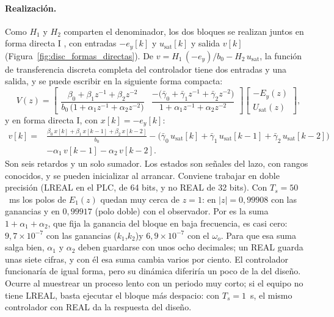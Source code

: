 \paragraph{Realización.} Como $H_1$ y $H_2$ comparten el denominador, los dos
bloques se realizan juntos en forma directa I \cite{chen1993analog}, con
entradas $-e_y[k]$ y $u_{\mathrm{sat}}[k]$ y salida $v[k]$
(Figura~\ref{fig:disc_formas_directas}). De
$v = H_1\,(-e_y)/b_0 - H_2\,u_{\mathrm{sat}}$, la función de transferencia
discreta completa del controlador tiene dos entradas y una salida, y se puede escribir en la
siguiente forma compacta:
\begin{equation}
V(z) =
\begin{bmatrix}
\dfrac{\beta_0 + \beta_1 z^{-1} + \beta_2 z^{-2}}{b_0\,\bigl(1 + \alpha_1 z^{-1} + \alpha_2 z^{-2}\bigr)}
&
\dfrac{-\bigl(\bar{\gamma}_0 + \bar{\gamma}_1 z^{-1} + \bar{\gamma}_2 z^{-2}\bigr)}{1 + \alpha_1 z^{-1} + \alpha_2 z^{-2}}
\end{bmatrix}
\begin{bmatrix} -E_y(z) \\[4pt] U_{\mathrm{sat}}(z) \end{bmatrix},
\label{eq:disc_gpi_miso}
\end{equation}
y en forma directa I, con $x[k] = -e_y[k]$:
\begin{equation}
\begin{aligned}
v[k] = {} & \frac{\beta_0\,x[k] + \beta_1\,x[k-1] + \beta_2\,x[k-2]}{b_0}
- \bigl(\bar{\gamma}_0\,u_{\mathrm{sat}}[k] + \bar{\gamma}_1\,u_{\mathrm{sat}}[k-1] + \bar{\gamma}_2\,u_{\mathrm{sat}}[k-2]\bigr) \\
& - \alpha_1\,v[k-1] - \alpha_2\,v[k-2] .
\end{aligned}
\label{eq:disc_gpi_fd1}
\end{equation}
Son seis retardos y un solo sumador. Los estados son señales del lazo, con
rangos conocidos, y se pueden inicializar al arrancar. Conviene trabajar en doble precisión (LREAL en el PLC, de 64 bits, y no REAL de 32 bits).
Con $T_s = 50$~ms los polos de $E_1(z)$ quedan muy cerca de $z = 1$: en $|z| = 0{,}99908$ con
las ganancias y en $0{,}99917$ (polo doble) con el observador. Por es la suma $1 + \alpha_1 + \alpha_2$, que fija la ganancia del bloque en baja
frecuencia, es casi cero: $9{,}7\times10^{-7}$ con las ganancias ($k_1$,$k_2$)y $6{,}9\times10^{-7}$ con el
$\omega_o$. Para que esa suma salga bien, $\alpha_1$ y $\alpha_2$ deben guardarse con unos ocho
decimales; un REAL guarda unas siete cifras, y con él esa suma cambia varios por ciento. El controlador funcionaría de igual forma, pero su dinámica diferiría
un poco de la del diseño. Ocurre al muestrear un proceso lento con un periodo muy corto; si el equipo
no tiene LREAL, basta ejecutar el bloque más despacio: con $T_s = 1$~s, el mismo controlador con REAL
da la respuesta del diseño.

